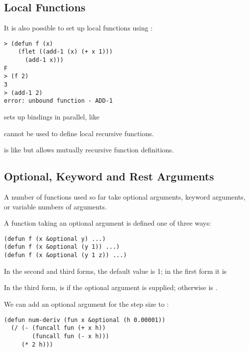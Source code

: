\begin{slide}{}
\subsection{Local Functions}
It is also possible to set up local functions using :
{\Large
\begin{verbatim}
> (defun f (x)
    (flet ((add-1 (x) (+ x 1)))
      (add-1 x)))
F
> (f 2)
3
> (add-1 2)
error: unbound function - ADD-1
\end{verbatim}}
 sets up bindings in parallel, like 

 cannot be used to define local recursive functions.

 is like  but allows mutually recursive function
definitions.
\end{slide}

\begin{slide}{}
\subsection{Optional, Keyword and Rest Arguments}
A number of functions used so far take optional arguments, keyword
arguments, or variable numbers of arguments.

A function taking an optional argument is defined one of three ways:
{\Large
\begin{verbatim}
(defun f (x &optional y) ...)
(defun f (x &optional (y 1)) ...)
(defun f (x &optional (y 1 z)) ...)
\end{verbatim}}
In the second and third forms, the default value is 1; in the first
form it is 

In the third form,  is  if the optional argument is
supplied; otherwise  is .

We can add an optional argument for the step size to
:
{\Large
\begin{verbatim}
(defun num-deriv (fun x &optional (h 0.00001))
  (/ (- (funcall fun (+ x h))
        (funcall fun (- x h)))
     (* 2 h)))
\end{verbatim}}
\end{slide}

